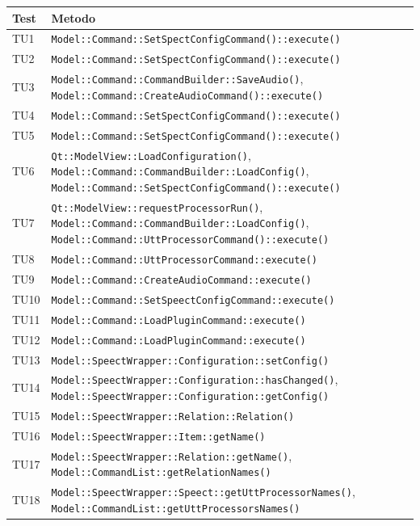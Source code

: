 \documentclass[openany,12pt,a4paper]{report}
\begin{document}
\begin{longtable}[c]{| p{2.5cm} |p{11.5cm}|}
	\hline
	\textbf{Test} & \textbf{Metodo}\\
	\hline
	\endhead
	TU1&
	\verb|Model::Command::SetSpectConfigCommand()::execute()|
	\\[1em]
	\hline
	TU2&
	\verb|Model::Command::SetSpectConfigCommand()::execute()|
	\\[1em]
	\hline
	TU3&
	\verb|Model::Command::CommandBuilder::SaveAudio()|, \verb|Model::Command::CreateAudioCommand()::execute()|
	\\[1em]
	\hline
	TU4&
	\verb|Model::Command::SetSpectConfigCommand()::execute()|
	\\[1em]
	\hline
	TU5&
	\verb|Model::Command::SetSpectConfigCommand()::execute()|
	\\[1em]
	\hline
	TU6&
	\verb|Qt::ModelView::LoadConfiguration()|,
	\verb|Model::Command::CommandBuilder::LoadConfig()|,
	\verb|Model::Command::SetSpectConfigCommand()::execute()|
	\\[1em]
	\hline
	TU7&
	\verb|Qt::ModelView::requestProcessorRun()|,
	\verb|Model::Command::CommandBuilder::LoadConfig()|,
	\verb|Model::Command::UttProcessorCommand()::execute()|
	\\[1em]
	\hline
	TU8&
	\verb|Model::Command::UttProcessorCommand::execute()|
	\\[1em]
	\hline
	TU9&
	\verb|Model::Command::CreateAudioCommand::execute()|
	\\[1em]
	\hline
	TU10&
	\verb|Model::Command::SetSpeectConfigCommand::execute()|
	\\[1em]
	\hline
	TU11&
	\verb|Model::Command::LoadPluginCommand::execute()|
	\\[1em]
	\hline
	TU12&
	\verb|Model::Command::LoadPluginCommand::execute()|
	\\[1em]
	\hline
	TU13&
	\verb|Model::SpeectWrapper::Configuration::setConfig()|
	\\[1em]
	\hline
	TU14&
	\verb|Model::SpeectWrapper::Configuration::hasChanged()|,
	\verb|Model::SpeectWrapper::Configuration::getConfig()|
	\\[1em]
	\hline
	TU15&
	\verb|Model::SpeectWrapper::Relation::Relation()|
	\\[1em]
	\hline
	TU16&
	\verb|Model::SpeectWrapper::Item::getName()|
	\\[1em]
	\hline
	TU17&
	\verb|Model::SpeectWrapper::Relation::getName()|, \verb|Model::CommandList::getRelationNames()|
	\\[1em]
	\hline
	TU18&
	\verb|Model::SpeectWrapper::Speect::getUttProcessorNames()|, \verb|Model::CommandList::getUttProcessorsNames()|

\end{longtable}
\end{document}
